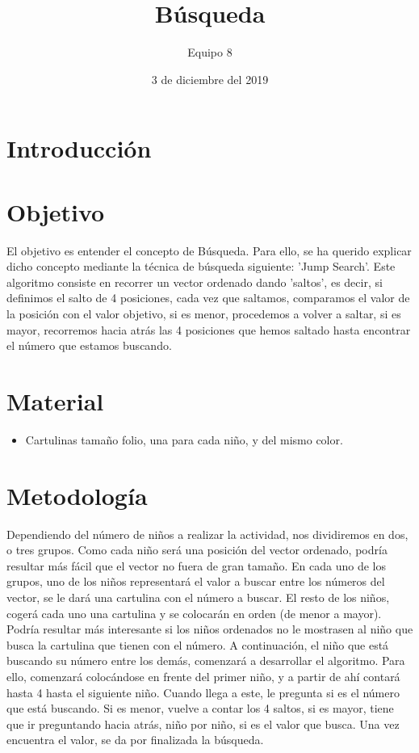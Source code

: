 \documentclass{article}
\title{Búsqueda}
\author{Equipo 8}
\date{3 de diciembre del 2019}
\begin{document}
\tableofcontents

\maketitle

\section{Introducción}

\section{Objetivo}
El objetivo es entender el concepto de Búsqueda. Para ello, se ha querido explicar dicho concepto mediante la técnica de búsqueda siguiente: 'Jump Search'.
Este algoritmo consiste en recorrer un vector ordenado dando 'saltos', es decir, si definimos el salto de 4 posiciones, cada vez que saltamos, comparamos el valor de la posición con el valor objetivo, si es menor, procedemos a volver a saltar, si es mayor, recorremos hacia atrás las 4 posiciones que hemos saltado hasta encontrar el número que estamos buscando. 

\section{Material}
\begin{itemize}
\item Cartulinas tamaño folio, una para cada niño, y del mismo color.
\end{itemize}

\section{Metodología}
Dependiendo del número de niños a realizar la actividad, nos dividiremos en dos, o tres grupos. Como cada niño será una posición del vector ordenado, podría resultar más fácil que el vector no fuera de gran tamaño. 
En cada uno de los grupos, uno de los niños representará el valor a buscar entre los números del vector, se le dará una cartulina con el número a buscar. El resto de los niños, cogerá cada uno una cartulina y se colocarán en orden (de menor a mayor). Podría resultar más interesante si los niños ordenados no le mostrasen al niño que busca la cartulina que tienen con el número. A continuación, el niño que está buscando su número entre los demás, comenzará a desarrollar el algoritmo.
Para ello, comenzará colocándose en frente del primer niño, y a partir de ahí contará hasta 4 hasta el siguiente niño. Cuando llega a este, le pregunta si es el número que está buscando. Si es menor, vuelve a contar los 4 saltos, si es mayor, tiene que ir preguntando hacia atrás, niño por niño, si es el valor que busca. 
Una vez encuentra el valor, se da por finalizada la búsqueda.
\end{document}
